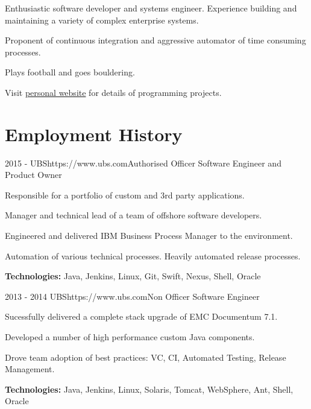 \documentclass[10pt]{article}
\begin{document}
{\begin{itemize-noindent}
\setlength\itemsep{-0.2em}
\item Enthusiastic software developer and systems engineer. Experience building and maintaining a variety of complex enterprise systems.
\item Proponent of continuous integration and aggressive automator of time consuming processes.
\item Plays football and goes bouldering. 
\item Visit \href{http://www.mglewis.co.uk}{personal website} for details of programming projects.
\end{itemize-noindent}


\section{Employment History}

\job
{2015 -}
{UBS}{https://www.ubs.com}{Authorised Officer}
{Software Engineer and Product Owner}
{\begin{itemize-noindent}
\setlength\itemsep{-0.2em}
\item Responsible for a portfolio of custom and 3rd party applications.
\item Manager and technical lead of a team of offshore software developers.
\item Engineered and delivered IBM Business Process Manager to the environment.
\item Automation of various technical processes. Heavily automated release processes.
\end{itemize-noindent}
\textbf{Technologies:} Java, Jenkins, Linux, Git, Swift, Nexus, Shell, Oracle}

\job
{2013 - 2014}
{UBS}{https://www.ubs.com}{Non Officer}
{Software Engineer}
{\begin{itemize-noindent}
\setlength\itemsep{-0.2em}
\item Sucessfully delivered a complete stack upgrade of EMC Documentum 7.1.
\item Developed a number of high performance custom Java components.
\item Drove team adoption of best practices: VC, CI, Automated Testing, Release Management.
\end{itemize-noindent}
\textbf{Technologies:} Java, Jenkins, Linux, Solaris, Tomcat, WebSphere, Ant, Shell, Oracle}


}
\end{document}
